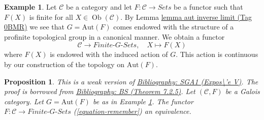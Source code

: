 \documentclass{amsart}
\newenvironment{reference}{\comment}{\endcomment}
\theoremstyle{plain}
\newtheorem{proposition}[subsection]{Proposition}
\theoremstyle{definition}
\newtheorem{example}[subsection]{Example}
\theoremstyle{remark}
\numberwithin{equation}{subsection}
\def\Ob{\mathop{\mathrm{Ob}}\nolimits}
\begin{document}
\begin{example}
\label{example-from-C-F-to-G-sets}
Let $\mathcal{C}$ be a category and let $F : \mathcal{C} \to \textit{Sets}$
be a functor such that $F(X)$ is finite for all $X \in \Ob(\mathcal{C})$.
By Lemma \href{https://stacks.math.columbia.edu/tag/0BMR}{lemma aut inverse limit (Tag 0BMR)} we see that $G = \text{Aut}(F)$
comes endowed with the structure of a profinite topological group in a
canonical manner. We obtain a functor
\begin{equation}
\label{equation-remember}
\mathcal{C} \longrightarrow \textit{Finite-}G\textit{-Sets},\quad
X \longmapsto F(X)
\end{equation}
where $F(X)$ is endowed with the induced action of $G$. This action
is continuous by our construction of the topology on $\text{Aut}(F)$.
\end{example}

\begin{proposition}
\label{proposition-galois}
\begin{reference}
This is a weak version of \href{https://stacks.math.columbia.edu/bibliography}{Bibliography: SGA1 (Expos\textbackslash{}'e V)}.
The proof is borrowed from \href{https://stacks.math.columbia.edu/bibliography}{Bibliography: BS (Theorem 7.2.5)}.
\end{reference}
Let $(\mathcal{C}, F)$ be a Galois category. Let $G = \text{Aut}(F)$
be as in Example \ref{example-from-C-F-to-G-sets}. The functor
$F : \mathcal{C} \to \textit{Finite-}G\textit{-Sets}$
(\ref{equation-remember}) an equivalence.
\end{proposition}
\end{document}

